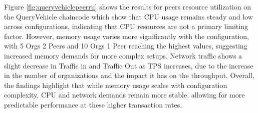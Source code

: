 Figure \ref{fig:queryvehiclepeerru}
shows the results for peers resource utilization on the QueryVehicle chaincode which show that CPU usage remains steady and low
across configurations, indicating that CPU resources are not a primary limiting factor. However, memory usage varies more significantly with
the configuration, with 5 Orgs 2 Peers and 10 Orgs 1 Peer reaching the highest values, suggesting increased memory demands for more complex
setups. Network traffic shows a slight decrease in Traffic in and Traffic Out as TPS increases, due to the increase in the number of
organizations and the impact it has on the throughput. Overall, the findings highlight that while memory usage scales with configuration
complexity, CPU and network demands remain more stable, allowing for more predictable performance at these higher transaction rates.


